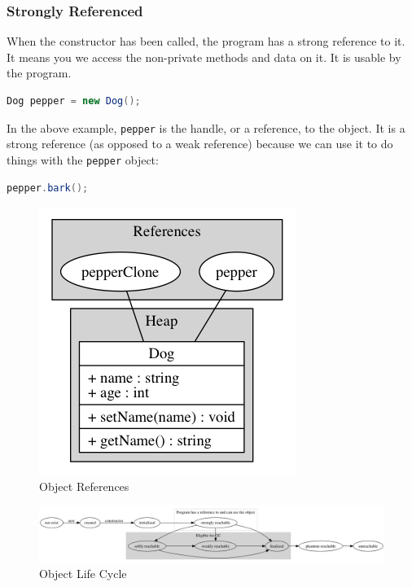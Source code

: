 \subsubsection{Strongly Referenced}
When the constructor has been called, the program has a strong reference to it.\cite{reference} It means you we access the non-private methods and data on it. It is usable by the program.
\begin{lstlisting}[language=Java]
Dog pepper = new Dog();
\end{lstlisting}
In the above example, \texttt{pepper} is the handle, or a reference, to the object. It is a strong reference (as opposed to a weak reference) because we can use it to do things with the \texttt{pepper} object:
\begin{lstlisting}[language=Java]
pepper.bark();
\end{lstlisting}
\begin{figure}[H]\centering %
\includegraphics[width=0.5\linewidth, frame]{object-reference}
\caption{Object References}
\label{fig:object-references}
\end{figure}
\begin{figure}[!htp]\centering %
\includegraphics[width=\textwidth, frame]{object-life-cycle.png}
\caption{Object Life Cycle}
\label{fig:object-life-cycle}
\end{figure}

